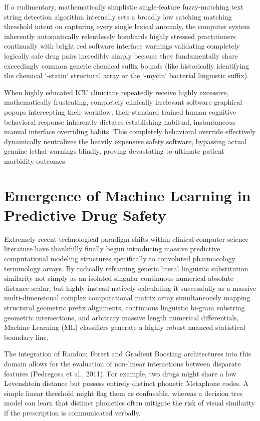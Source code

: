 \documentclass[12pt,a4paper]{report}
\begin{document}
If a rudimentary, mathematically simplistic single-feature fuzzy-matching text string detection algorithm internally sets a broadly low catching matching threshold intent on capturing every single lexical anomaly, the computer system inherently automatically relentlessly bombards highly stressed practitioners continually with bright red software interface warnings validating completely logically safe drug pairs incredibly simply because they fundamentally share exceedingly common generic chemical suffix bounds (like historically identifying the chemical `-statin` structural array or the `-mycin` bacterial linguistic suffix).

When highly educated ICU clinicians repeatedly receive highly excessive, mathematically frustrating, completely clinically irrelevant software graphical popups intercepting their workflow, their standard trained human cognitive behavioral response inherently dictates establishing habitual, instantaneous manual interface overriding habits. This completely behavioral override effectively dynamically neutralizes the heavily expensive safety software, bypassing actual genuine lethal warnings blindly, proving devastating to ultimate patient morbidity outcomes.

\section{Emergence of Machine Learning in Predictive Drug Safety}
Extremely recent technological paradigm shifts within clinical computer science literature have thankfully finally begun introducing massive predictive computational modeling structures specifically to convoluted pharmacology terminology arrays. By radically reframing generic literal linguistic substitution similarity not simply as an isolated singular continuous numerical absolute distance scalar, but highly instead natively calculating it successfully as a massive multi-dimensional complex computational matrix array simultaneously mapping structural geometric prefix alignments, continuous linguistic bi-gram substring geometric intersections, and arbitrary massive length numerical differentials, Machine Learning (ML) classifiers generate a highly robust nuanced statistical boundary line.

The integration of Random Forest and Gradient Boosting architectures into this domain allows for the evaluation of non-linear interactions between disparate features (Pedregosa et al., 2011). For example, two drugs might share a low Levenshtein distance but possess entirely distinct phonetic Metaphone codes. A simple linear threshold might flag them as confusable, whereas a decision tree model can learn that distinct phonetics often mitigate the risk of visual similarity if the prescription is communicated verbally.
\end{document}
